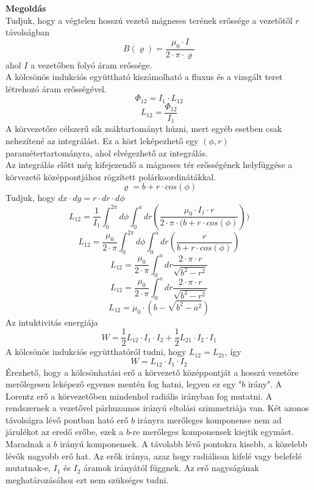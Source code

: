 \documentclass[11pt,a4paper,openany,leqno]{article}
\begin{document}
\textbf{Megoldás}\\
\indent
Tudjuk, hogy a végtelen hosszú vezető mágneses terének erőssége a vezetőtől $r$ távolságban\\
$$ B(\varrho) = \frac{\mu_0 \cdot I}{2\cdot \pi \cdot \varrho} $$\indent
ahol $I$ a vezetőben folyó áram erőssége.\\ \indent
A kölcsönös indukciós együttható kiszámolható a fluxus és a vizsgált teret létrehozó áram erősségével.\\
$$ \Phi_{12} = I_1 \cdot L_{12} $$
$$ L_{12} = \frac{\Phi_{12}}{I_1} $$
A körvezetőre célszerű sík zsáktartományt húzni, mert egyéb esetben csak nehezítené az integrálást. Ez a kört leképezhető egy $(\phi,r)$ paramétertartományra, ahol elvégezhető az integrálás.\\ \indent
Az integrálás előtt még kifejezendő a mágneses tér erősségének helyfüggése a körvezető középpontjához rögzített polárkoordinátákkal.\\ \indent
$$ \varrho = b + r\cdot cos(\phi) $$\indent
Tudjuk, hogy $dx\cdot dy = r\cdot dr \cdot d\phi$
$$ L_{12} = \frac{1}{I_1} \int_{0}^{2\pi} d\phi \int_{0}^{a}dr (\frac{\mu_0 \cdot I_1 \cdot r}{2\cdot \pi \cdot(b+r\cdot cos(\phi)})) $$
$$ L_{12} = \frac{\mu_0}{2\cdot \pi} \int_{0}^{2\pi} d\phi \int_{0}^{a}dr (\frac{r}{b+r\cdot cos(\phi)}) $$
$$ L_{12} = \frac{\mu_0}{2\cdot \pi} \int_{0}^{a}dr \frac{2\cdot \pi \cdot r}{\sqrt{b^2 - r^2}} $$
$$ L_{12} = \frac{\mu_0}{2\cdot \pi} \int_{0}^{a}dr \frac{2\cdot \pi \cdot r}{\sqrt{b^2 - r^2}} $$
$$ L_{12} = \mu_0\cdot(b-\sqrt{b^2 - a^2}) $$
\indent
Az intuktivitás energiája\\
$$ W = \frac{1}{2}L_{12}\cdot I_1\cdot I_2 + \frac{1}{2}L_{21}\cdot I_2\cdot I_1 $$\indent
A kölcsönös indukciós együtthatóról tudni, hogy $L_{12} = L_{21}$, így\\
$$ W = L_{12}\cdot I_1\cdot I_2 $$\indent
Érezhető, hogy a kölcsönhatási erő a körvezető középpontját a hosszú vezetőre merőlegesen leképező egyenes mentén fog hatni, legyen ez egy "$b$ irány". A Lorentz erő a körvezetőben mindenhol radiális irányban fog mutatni. A rendszernek a vezetővel párhuzamos irányú eltolási szimmetriája van. Két azonos távolságra lévő pontban ható erő $b$ irányra merőleges komponense nem ad járulékot az eredő erőbe, ezek a $b$-re merőleges komponensek kiejtik egymást. Maradnak a $b$ irányú komponensek. A távolabb lévő pontokra kisebb, a közelebb lévők nagyobb erő hat. Az erők iránya, azaz hogy radiálisan kifelé vagy belefelé mutatnak-e, $I_1$ és $I_2$ áramok irányától függnek. Az erő nagyságának meghatározásához ezt nem szükséges tudni.\\ \indent
\end{document}
